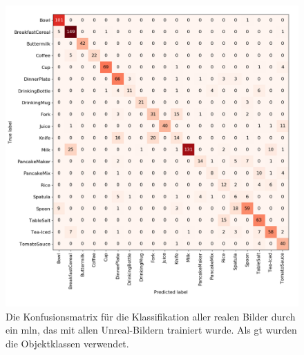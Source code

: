 \begin{figure}
	\includegraphics[scale=.3]{img/chapter6/UnrealRealGTClass.png}
\caption[Konfusionsmatrix der Objektklassen Klassifikation mit Unreal-Trainingsset und realem Testset]{Die Konfusionsmatrix für die Klassifikation aller realen Bilder durch ein \gls{mln}, das mit allen Unreal-Bildern trainiert wurde. Als \gls{gt} wurden die Objektklassen verwendet.}
\label{fig:UnrealRealGTClass_confMatrix}
\end{figure}  

